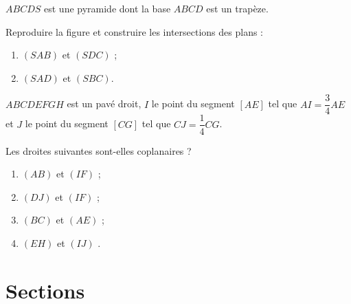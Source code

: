\documentclass{cornouaille}
\begin{document}
\pagebreak

\begin{exercice}
  $ABCDS$ est une pyramide dont la base $ABCD$ est un trapèze.

  \begin{center}
  \end{center}

  Reproduire la figure et construire les intersections des plans :
  \begin{enumerate}
  \item $(SAB)$ et $(SDC)$ ;
  \item $(SAD)$ et $(SBC)$.
  \end{enumerate}
\end{exercice}
 
\begin{exercice}
  $ABCDEFGH$ est un pavé droit, $I$ le point du segment $[AE]$ tel que
  $AI=\dfrac{3}{4}AE$ et $J$ le point du segment $[CG]$ tel que
  $CJ=\dfrac{1}{4}CG$.

  Les droites suivantes sont-elles coplanaires ?
  \begin{enumerate}
  \item $(AB)$ et $(IF)$ ;
  \item $(DJ)$ et $(IF)$ ;
  \item $(BC)$ et $(AE)$ ;
  \item $(EH)$ et $(IJ)$ .
  \end{enumerate}
\end{exercice}

\section{Sections}
\end{document}
